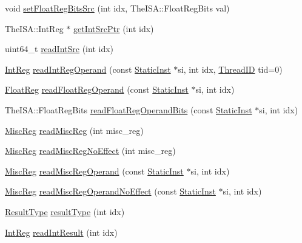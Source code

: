 \begin{DoxyCompactItemize}
\item 
void \hyperlink{classInOrderDynInst_ab145f512e94dde24bc1d4a56252285ee}{setFloatRegBitsSrc} (int idx, TheISA::FloatRegBits val)
\item 
TheISA::IntReg $\ast$ \hyperlink{classInOrderDynInst_acb0330fc1cf3bc2e95a80781a674a610}{getIntSrcPtr} (int idx)
\item 
uint64\_\-t \hyperlink{classInOrderDynInst_a7d7601b697b7124a589fa6fed48d6fc5}{readIntSrc} (int idx)
\item 
\hyperlink{classInOrderDynInst_a1355cb78d031430d4d70eb5080267604}{IntReg} \hyperlink{classInOrderDynInst_a3fc2b67b903ef16132627604a1564938}{readIntRegOperand} (const \hyperlink{classStaticInst}{StaticInst} $\ast$si, int idx, \hyperlink{base_2types_8hh_ab39b1a4f9dad884694c7a74ed69e6a6b}{ThreadID} tid=0)
\item 
\hyperlink{classInOrderDynInst_a75484259f1855aabc8d74c6eb1cfe186}{FloatReg} \hyperlink{classInOrderDynInst_a717c88c8c56d79c9ed554ba5992bd8c3}{readFloatRegOperand} (const \hyperlink{classStaticInst}{StaticInst} $\ast$si, int idx)
\item 
TheISA::FloatRegBits \hyperlink{classInOrderDynInst_a39d93624e4481f4a210f2c46ea6b15b0}{readFloatRegOperandBits} (const \hyperlink{classStaticInst}{StaticInst} $\ast$si, int idx)
\item 
\hyperlink{classInOrderDynInst_aaf5f073a387db0556d1db4bcc45428bc}{MiscReg} \hyperlink{classInOrderDynInst_a5a8c6c487e8da143d26188258b04f1cc}{readMiscReg} (int misc\_\-reg)
\item 
\hyperlink{classInOrderDynInst_aaf5f073a387db0556d1db4bcc45428bc}{MiscReg} \hyperlink{classInOrderDynInst_a7b5ac6af9c2c19d7c1b442b8a3aebbc6}{readMiscRegNoEffect} (int misc\_\-reg)
\item 
\hyperlink{classInOrderDynInst_aaf5f073a387db0556d1db4bcc45428bc}{MiscReg} \hyperlink{classInOrderDynInst_ac6d0dc1a63cede82f4242d43236a98db}{readMiscRegOperand} (const \hyperlink{classStaticInst}{StaticInst} $\ast$si, int idx)
\item 
\hyperlink{classInOrderDynInst_aaf5f073a387db0556d1db4bcc45428bc}{MiscReg} \hyperlink{classInOrderDynInst_af527fa993c1c80fdc58ab56a069bdd01}{readMiscRegOperandNoEffect} (const \hyperlink{classStaticInst}{StaticInst} $\ast$si, int idx)
\item 
\hyperlink{classInOrderDynInst_aa71b5fc2a82d29a91db3a734ff892a49}{ResultType} \hyperlink{classInOrderDynInst_ac7c22f0fa3a2730e7dd23e7be39a3d36}{resultType} (int idx)
\item 
\hyperlink{classInOrderDynInst_a1355cb78d031430d4d70eb5080267604}{IntReg} \hyperlink{classInOrderDynInst_ae4e4227a87d6a0625e0870c0072a3122}{readIntResult} (int idx)

\end{DoxyCompactItemize}
